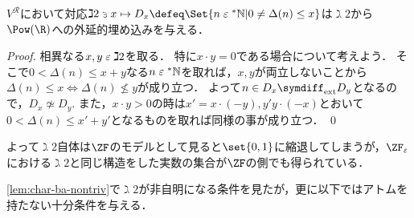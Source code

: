 \documentclass[realisability.tex]{subfiles}
\begin{document}
\begin{lemma}\label{lem:D-base-ext-inj}
 $V^{\mathcal{R}}$において対応$\gimel 2 \strni x \mapsto D_x \defeq \Set{n \strin \NN | 0 \neq \Delta(n) \leq x}$は$\gimel2$から$\Pow(\R)$への外延的埋め込みを与える．
\end{lemma}
\begin{proof}
 相異なる$x, y \mathrel{\varepsilon} \gimel 2$を取る．
 特に$x \cdot y = 0$である場合について考えよう．
 そこで$0 < \Delta(n) \leq x + y$なる$n \mathrel{\varepsilon} \mathord{{}^{*}\mathbb{N}}$を取れば，$x, y$が両立しないことから$\Delta(n) \leq x \iff \Delta(n) \nleq y$が成り立つ．
 よって$n \in D_x \symdiff_{\text{ext}} D_y$となるので，$D_x \not\simeq D_y$.
 また，$x \cdot y > 0$の時は$x' = x \cdot (- y), y' y \cdot (- x)$とおいて$0 < \Delta(n) \leq x' + y'$となるものを取れば同様の事が成り立つ． \qed
\end{proof}
よって$\gimel 2$自体は$\ZF$のモデルとして見ると$\set{0, 1}$に縮退してしまうが，$\ZFe$における$\gimel 2$と同じ構造をした実数の集合が$\ZF$の側でも得られている．

\cref{lem:char-ba-nontriv}で$\gimel2$が非自明になる条件を見たが，更に以下ではアトムを持たない十分条件を与える．
\end{document}
